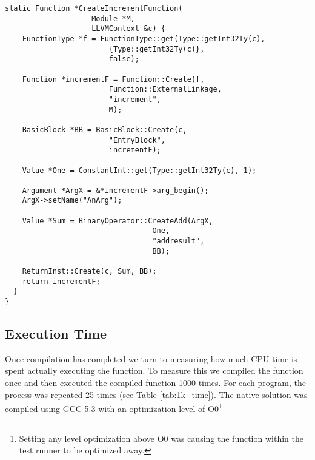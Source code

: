 \begin{lstlisting}[float,floatplacement=H,
  caption={Generating MCJIT IR for the increment program.},
  label=lst:llvm_increment]
  static Function *CreateIncrementFunction(
                    Module *M, 
                    LLVMContext &c) {
    FunctionType *f = FunctionType::get(Type::getInt32Ty(c), 
                        {Type::getInt32Ty(c)}, 
                        false);
    
    Function *incrementF = Function::Create(f, 
                        Function::ExternalLinkage, 
                        "increment", 
                        M);

    BasicBlock *BB = BasicBlock::Create(c, 
                        "EntryBlock", 
                        incrementF);
    
    Value *One = ConstantInt::get(Type::getInt32Ty(c), 1);
    
    Argument *ArgX = &*incrementF->arg_begin(); 
    ArgX->setName("AnArg");
  
    Value *Sum = BinaryOperator::CreateAdd(ArgX, 
                                  One,
                                  "addresult", 
                                  BB);
  
    ReturnInst::Create(c, Sum, BB);
    return incrementF;
  }
}\end{lstlisting}

\subsection{Execution Time}
Once compilation has completed we turn to measuring how much CPU time is spent actually executing the function.
To measure this we compiled the function once and then executed the compiled function 1000 times.
For each program, the process was repeated 25 times (see Table \ref{tab:1k_time}).
The native solution was compiled using GCC 5.3 with an optimization level of O0\footnote{
  Setting any level optimization above O0 was causing the function within the test runner to be optimized away.
}



